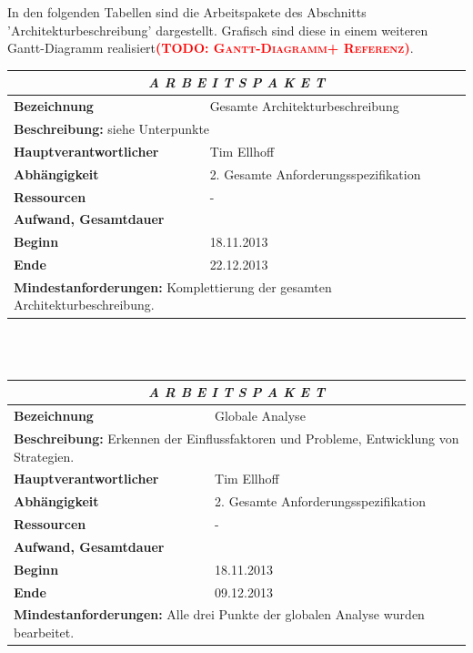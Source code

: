 \documentclass[fontsize=12pt,paper=a4,twoside]{scrartcl}
\newcommand{\todo}[1]{\textbf{\textsc{\textcolor{red}{(TODO: #1)}}}}
\begin{document}
In den folgenden Tabellen sind die Arbeitspakete des Abschnitts 'Architekturbeschreibung' dargestellt. Grafisch sind diese in einem weiteren Gantt-Diagramm realisiert\todo{Gantt-Diagramm+ Referenz}.

\begin{tabular}{p{7.5cm}|p{7.5cm}}\toprule
\multicolumn{2}{c}{\textbf{\textit{A R B E I T S P A K E T \quad 3}}} \\ \toprule \hline
\textbf{Bezeichnung} & Gesamte Architekturbeschreibung\\\hline
\multicolumn{2}{p{15cm}}{\textbf{Beschreibung:} \newline 
siehe Unterpunkte}  \\\hline
\textbf{Hauptverantwortlicher} & Tim Ellhoff \\\hline
\textbf{Abhängigkeit} & 2. Gesamte Anforderungsspezifikation\\\hline
\textbf{Ressourcen} & -
\\\hline
\textbf{Aufwand, Gesamtdauer} & \\\hline
\textbf{Beginn} & 18.11.2013 \\\hline
\textbf{Ende} & 22.12.2013\\\hline
\multicolumn{2}{p{15cm}}{\textbf{Mindestanforderungen: } \newline
Komplettierung der gesamten Architekturbeschreibung. }  \\ \toprule
\end{tabular} \\\\

\begin{tabular}{p{7.5cm}|p{7.5cm}}\toprule
\multicolumn{2}{c}{\textbf{\textit{A R B E I T S P A K E T \quad 3.1}}} \\ \toprule \hline
\textbf{Bezeichnung} & Globale Analyse\\\hline
\multicolumn{2}{p{15cm}}{\textbf{Beschreibung:} \newline 
Erkennen der Einflussfaktoren und Probleme, Entwicklung von Strategien.}  \\\hline
\textbf{Hauptverantwortlicher} & Tim Ellhoff \\\hline
\textbf{Abhängigkeit} & 2. Gesamte Anforderungsspezifikation\\\hline
\textbf{Ressourcen} & -
\\\hline
\textbf{Aufwand, Gesamtdauer} & \\\hline
\textbf{Beginn} & 18.11.2013 \\\hline
\textbf{Ende} & 09.12.2013\\\hline
\multicolumn{2}{p{15cm}}{\textbf{Mindestanforderungen: } \newline
Alle drei Punkte der globalen Analyse wurden bearbeitet. }  \\ \toprule
\end{tabular} \\\\
\end{document}
